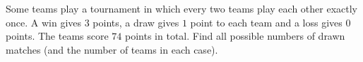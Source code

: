 Some teams play a tournament in which every two teams play each other exactly once. A win gives $3$ points, a draw gives $1$ point to each team and a loss gives $0$ points. The teams score $74$ points in total. Find all possible numbers of drawn matches (and the number of teams in each case).
